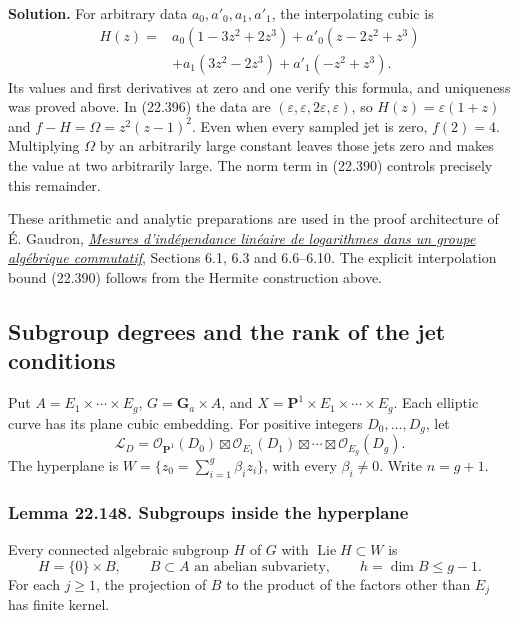 \documentclass[
  11pt,
  a4paper,
]{article}
\begin{document}
\textbf{Solution.} For arbitrary data \(a_0,a'_0,a_1,a'_1\), the
interpolating cubic is \[
 \begin{aligned}
 H(z)={}&a_0(1-3z^2+2z^3)+a'_0(z-2z^2+z^3)\\
       &+a_1(3z^2-2z^3)+a'_1(-z^2+z^3).
 \end{aligned}
 \tag{22.397}
\] Its values and first derivatives at zero and one verify this formula,
and uniqueness was proved above. In (22.396) the data are
\((\varepsilon,\varepsilon,2\varepsilon,\varepsilon)\), so
\(H(z)=\varepsilon(1+z)\) and \(f-H=\Omega=z^2(z-1)^2\). Even when every
sampled jet is zero, \(f(2)=4\). Multiplying \(\Omega\) by an
arbitrarily large constant leaves those jets zero and makes the value at
two arbitrarily large. The norm term in (22.390) controls precisely this
remainder.

These arithmetic and analytic preparations are used in the proof
architecture of É. Gaudron,
\href{https://lmbp.uca.fr/~gaudron/art4.pdf}{\emph{Mesures
d'indépendance linéaire de logarithmes dans un groupe algébrique
commutatif}}, Sections 6.1, 6.3 and 6.6--6.10. The explicit
interpolation bound (22.390) follows from the Hermite construction
above.

\subsection{Subgroup degrees and the rank of the jet
conditions}\label{subgroup-degrees-and-the-rank-of-the-jet-conditions}

Put \(A=E_1\times\cdots\times E_g\), \(G=\mathbf G_a\times A\), and
\(X=\mathbf P^1\times E_1\times\cdots\times E_g\). Each elliptic curve
has its plane cubic embedding. For positive integers \(D_0,\ldots,D_g\),
let \[
 \mathcal L_D=\mathcal O_{\mathbf P^1}(D_0)
       \boxtimes\mathcal O_{E_1}(D_1)\boxtimes\cdots
       \boxtimes\mathcal O_{E_g}(D_g).
 \tag{22.398}
\] The hyperplane is \(W=\{z_0=\sum_{i=1}^g\beta_i z_i\}\), with every
\(\beta_i\ne0\). Write \(n=g+1\).

\subsubsection{Lemma 22.148. Subgroups inside the
hyperplane}\label{lemma-22.148.-subgroups-inside-the-hyperplane}

Every connected algebraic subgroup \(H\) of \(G\) with
\(\operatorname{Lie}H\subset W\) is \[
 H=\{0\}\times B,\qquad B\subset A\text{ an abelian subvariety},
 \qquad h=\dim B\le g-1.
 \tag{22.399}
\] For each \(j\ge1\), the projection of \(B\) to the product of the
factors other than \(E_j\) has finite kernel.
\end{document}
